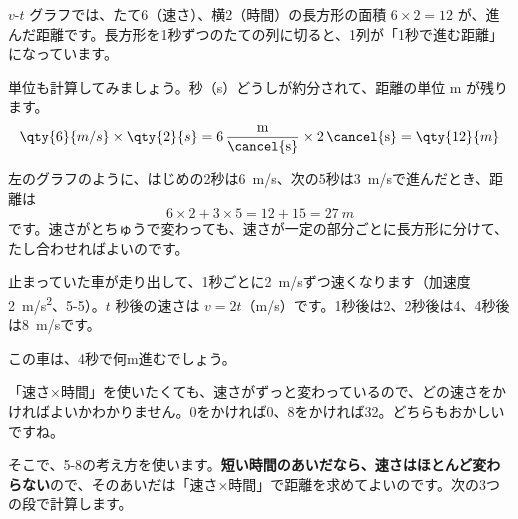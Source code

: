 \noindent\begin{minipage}[c]{0.46\linewidth}\centering
{}
\end{minipage}\hfill
\begin{minipage}[c]{0.5\linewidth}\raggedright
$v$-$t$ グラフでは、たて6（速さ）、横2（時間）の長方形の面積 $6\times2=12$ が、進んだ距離です。長方形を1秒ずつのたての列に切ると、1列が「1秒で進む距離」になっています。

単位も計算してみましょう。秒（s）どうしが約分されて、距離の単位 m が残ります。
\[ \qty{6}{m/s}\times\qty{2}{s}=6\,\frac{\mathrm{m}}{\cancel{\mathrm{s}}}\times2\,\cancel{\mathrm{s}}=\qty{12}{m} \]
\end{minipage}

\medskip
左のグラフのように、はじめの2秒は\qty{6}{m/s}、次の5秒は\qty{3}{m/s}で進んだとき、距離は
\[ 6\times2+3\times5=12+15=\qty{27}{m} \]
です。速さがとちゅうで変わっても、速さが一定の部分ごとに長方形に分けて、たし合わせればよいのです。


\label{bk:5-9:wakeru}止まっていた車が走り出して、1秒ごとに\qty{2}{m/s}ずつ速くなります（加速度\qty{2}{m/s^2}、5-5）。$t$ 秒後の速さは $v=2t$（m/s）です。1秒後は2、2秒後は4、4秒後は\qty{8}{m/s}です。

この車は、4秒で何m進むでしょう。

「速さ×時間」を使いたくても、速さがずっと変わっているので、どの速さをかければよいかわかりません。0をかければ0、8をかければ32。どちらもおかしいですね。

そこで、5-8の考え方を使います。\textbf{短い時間のあいだなら、速さはほとんど変わらない}ので、そのあいだは「速さ×時間」で距離を求めてよいのです。次の3つの段で計算します。

